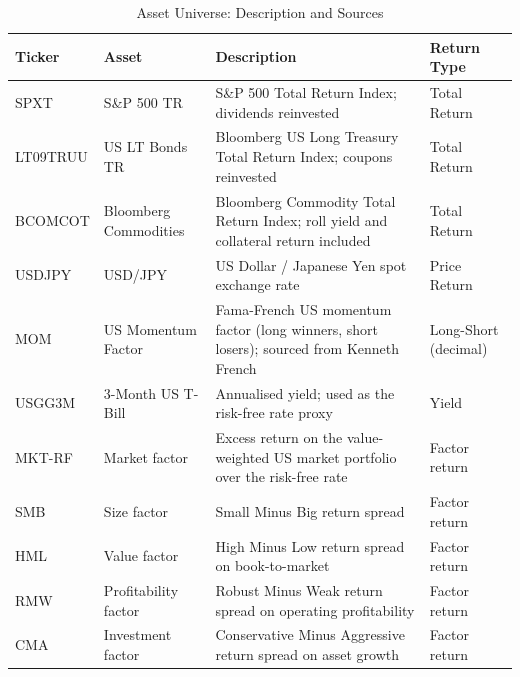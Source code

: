 \documentclass[12pt, a4paper]{article}
\begin{document}
\begin{table}[H]
  \centering
  \caption{Asset Universe: Description and Sources}
  \label{tab:data_desc}
  \small
  \begin{tabularx}{\textwidth}{llXl}
    \toprule
    \textbf{Ticker} & \textbf{Asset} & \textbf{Description} & \textbf{Return Type} \\
    \midrule
    SPXT     & S\&P 500 TR           & S\&P 500 Total Return Index; dividends reinvested
                                     & Total Return \\
    LT09TRUU & US LT Bonds TR        & Bloomberg US Long Treasury Total Return Index;
                                       coupons reinvested
                                     & Total Return \\
    BCOMCOT  & Bloomberg Commodities & Bloomberg Commodity Total Return Index; roll yield
                                       and collateral return included
                                     & Total Return \\
    USDJPY   & USD/JPY               & US Dollar / Japanese Yen spot exchange rate
                                     & Price Return \\
    MOM      & US Momentum Factor    & Fama-French US momentum factor (long winners, short
                                       losers); sourced from Kenneth French
                                     & Long-Short (decimal) \\
    USGG3M   & 3-Month US T-Bill     & Annualised yield; used as the risk-free rate proxy
                                     & Yield \\
    \midrule
    MKT-RF   & Market factor         & Excess return on the value-weighted US market
                                       portfolio over the risk-free rate
                                     & Factor return \\
    SMB      & Size factor           & Small Minus Big return spread
                                     & Factor return \\
    HML      & Value factor          & High Minus Low return spread on book-to-market
                                     & Factor return \\
    RMW      & Profitability factor  & Robust Minus Weak return spread on operating
                                       profitability
                                     & Factor return \\
    CMA      & Investment factor     & Conservative Minus Aggressive return spread on
                                       asset growth
                                     & Factor return \\
    \bottomrule
  \end{tabularx}
\end{table}
\end{document}
